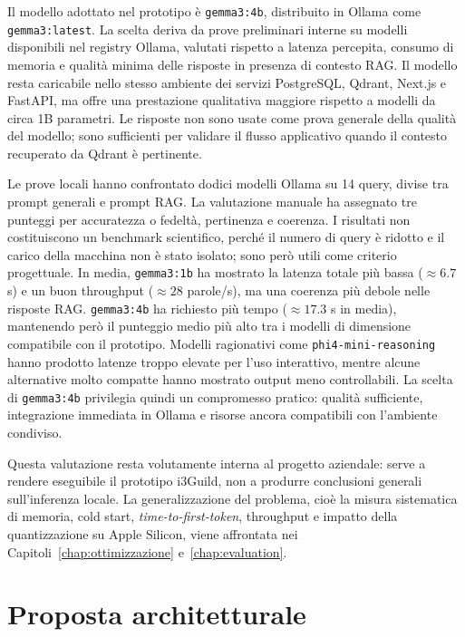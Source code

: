 \noindent Il modello adottato nel prototipo è \texttt{gemma3:4b}, distribuito
in Ollama come \texttt{gemma3:latest}. La scelta deriva da prove preliminari
interne su modelli disponibili nel registry Ollama, valutati rispetto a latenza
percepita, consumo di memoria e qualità minima delle risposte in presenza di
contesto RAG. Il modello resta caricabile nello stesso ambiente dei servizi
PostgreSQL, Qdrant, Next.js e FastAPI, ma offre una prestazione qualitativa maggiore
rispetto a modelli da circa 1B parametri. Le risposte non sono usate come prova
generale della qualità del modello; sono sufficienti per validare il flusso
applicativo quando il contesto recuperato da Qdrant è pertinente.

Le prove locali hanno confrontato dodici modelli Ollama su 14 query, divise tra
prompt generali e prompt RAG. La valutazione manuale ha assegnato tre punteggi
per accuratezza o fedeltà, pertinenza e coerenza. I risultati non costituiscono
un benchmark scientifico, perché il numero di query è ridotto e il carico della
macchina non è stato isolato; sono però utili come criterio progettuale. In
media, \texttt{gemma3:1b} ha mostrato la latenza totale più bassa
(\(\approx 6.7\) s) e un buon throughput (\(\approx 28\) parole/s), ma una
coerenza più debole nelle risposte RAG. \texttt{gemma3:4b} ha richiesto più
tempo (\(\approx 17.3\) s in media), mantenendo però il punteggio medio più alto
tra i modelli di dimensione compatibile con il prototipo. Modelli ragionativi
come \texttt{phi4-mini-reasoning} hanno prodotto latenze troppo elevate per
l'uso interattivo, mentre alcune alternative molto compatte hanno mostrato
output meno controllabili. La scelta di \texttt{gemma3:4b} privilegia quindi un
compromesso pratico: qualità sufficiente, integrazione immediata in Ollama e
risorse ancora compatibili con l'ambiente condiviso.

\noindent Questa valutazione resta volutamente interna al progetto aziendale:
serve a rendere eseguibile il prototipo i3Guild, non a produrre conclusioni
generali sull'inferenza locale. La generalizzazione del problema, cioè la misura
sistematica di memoria, cold start, \emph{time-to-first-token}, throughput e
impatto della quantizzazione su Apple Silicon, viene affrontata nei
Capitoli~\ref{chap:ottimizzazione} e~\ref{chap:evaluation}.

\section{Proposta architetturale}
\label{sec:architecture}

